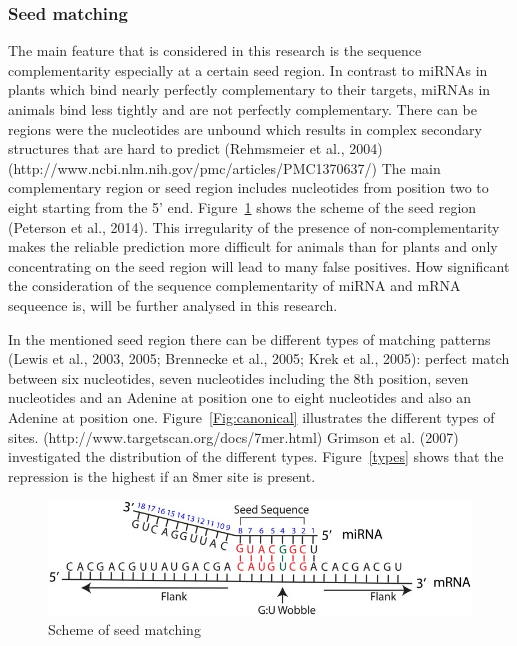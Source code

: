 \documentclass[12pt]{article}
\begin{document}
\subsubsection{Seed matching}
The main feature that is considered in this research is the sequence complementarity especially at a certain seed region. In contrast to miRNAs in plants which bind nearly perfectly complementary to their targets, miRNAs in animals bind less tightly and are not perfectly complementary. There can be regions were the nucleotides are unbound which results in complex secondary structures that are hard to predict (Rehmsmeier et al., 2004)(http://www.ncbi.nlm.nih.gov/pmc/articles/PMC1370637/) The main complementary region or seed region includes nucleotides from position two to eight starting from the 5' end. Figure~\ref{seed} shows the scheme of the seed region (Peterson et al., 2014). This irregularity of the presence of non-complementarity makes the reliable prediction more difficult for animals than for plants and only concentrating on the seed region will lead to many false positives. How significant the consideration of the sequence complementarity of miRNA and mRNA sequeence is, will be further analysed in this research. 

In the mentioned seed region there can be different types of matching patterns (Lewis et al., 2003, 2005; Brennecke et al., 2005; Krek et al., 2005): perfect match between six nucleotides, seven nucleotides including the 8th position, seven nucleotides and an Adenine at position one to eight nucleotides and also an Adenine at position one. Figure~\ref{Fig:canonical} illustrates the different types of sites. (http://www.targetscan.org/docs/7mer.html) Grimson et al. (2007) investigated the distribution of the different types. Figure~\ref{types} shows that the repression is the highest if an 8mer site is present. 


\begin{figure}
\centering
\includegraphics[scale=3]{results/seedmatching.png} 
\caption{Scheme of seed matching}
\label{seed}
\end{figure}
\end{document}

